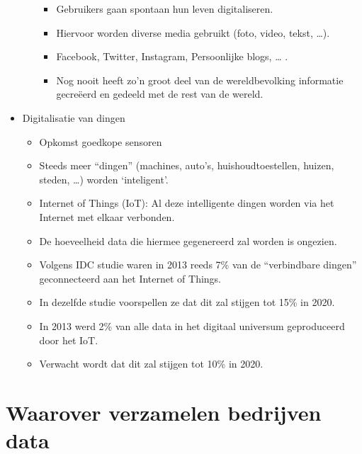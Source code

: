 \documentclass[]{memoir}
\providecommand{\tightlist}{%
  \setlength{\itemsep}{0pt}\setlength{\parskip}{0pt}}
\begin{document}
\begin{itemize}
\begin{itemize}
    \begin{itemize}
    \tightlist
    \item
      Gebruikers gaan spontaan hun leven digitaliseren.
    \item
      Hiervoor worden diverse media gebruikt (foto, video, tekst, \ldots{}).
    \item
      Facebook, Twitter, Instagram, Persoonlijke blogs, \ldots{} .
    \item
      Nog nooit heeft zo'n groot deel van de wereldbevolking informatie gecreëerd en gedeeld met de rest van de wereld.
    \end{itemize}
  \end{itemize}
\item
  Digitalisatie van dingen

  \begin{itemize}
  \tightlist
  \item
    Opkomst goedkope sensoren
  \item
    Steeds meer ``dingen'' (machines, auto's, huishoudtoestellen, huizen, steden, \ldots{}) worden `inteligent'.
  \item
    Internet of Things (IoT): Al deze intelligente dingen worden via het Internet met elkaar verbonden.
  \item
    De hoeveelheid data die hiermee gegenereerd zal worden is ongezien.
  \item
    Volgens IDC studie waren in 2013 reeds 7\% van de ``verbindbare dingen'' geconnecteerd aan het Internet of Things.
  \item
    In dezelfde studie voorspellen ze dat dit zal stijgen tot 15\% in 2020.
  \item
    In 2013 werd 2\% van alle data in het digitaal universum geproduceerd door het IoT.
  \item
    Verwacht wordt dat dit zal stijgen tot 10\% in 2020.
  \end{itemize}
\end{itemize}

\hypertarget{waarover-verzamelen-bedrijven-data}{%
\section{Waarover verzamelen bedrijven data}\label{waarover-verzamelen-bedrijven-data}}
\end{document}
